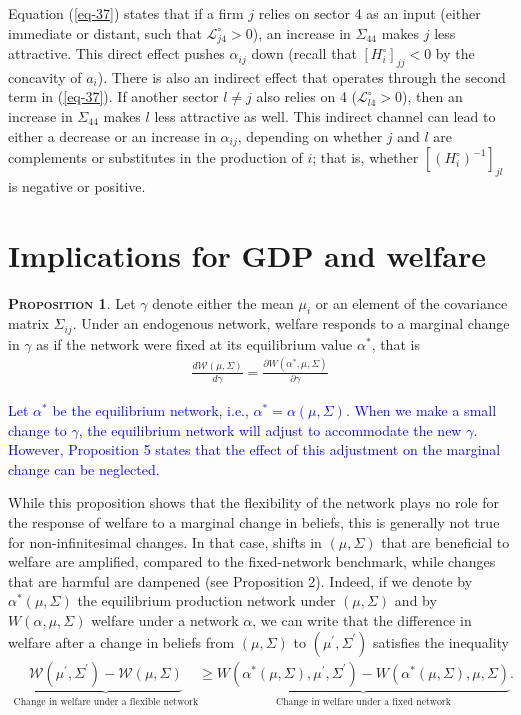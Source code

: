 \documentclass[11pt]{article}
\theoremstyle{definition}
\newtheorem{prop}{\noindent \textbf{\textsc{Proposition}}}
\begin{document}
	Equation (\ref{eq-37}) states that if a firm $j$ relies on sector 4 as an input (either immediate or distant, such that $\mathcal{L}_{j4}^{\circ} > 0$), an increase in $\Sigma_{44}$ makes $j$ less attractive. This direct effect pushes $\alpha_{ij}$ down (recall
	that $[H_i^{\circ}]_{jj} < 0$ by the concavity of $a_i$). There is also an indirect effect that operates through the second term in (\ref{eq-37}). If another sector $l\neq j$ also relies on 4 ($\mathcal{L}_{l4}^{\circ} > 0$), then an increase in $\Sigma_{44}$
	makes $l$ less attractive as well. This indirect channel can lead to either a decrease or an increase in $\alpha_{ij}$, depending on whether $j$ and $l$ are complements or substitutes in the production of $i$; that is, whether $[(H_i^{\circ})^{-1}]_{jl}$ is negative or positive.
	
	\section{Implications for GDP and welfare}
	\begin{prop}
		Let $\gamma$ denote either the mean $\mu_i$ or an element of the covariance matrix $\Sigma_{ij}$. Under an endogenous network, welfare responds to a marginal change in $\gamma$ as if the network were fixed at its equilibrium value $\alpha^*$, that is
		\begin{align*}
			\frac{d\mathcal{W}(\mu,\Sigma)}{d\gamma} = \frac{\partial W(\alpha^*,\mu,\Sigma)}{\partial\gamma}
		\end{align*}
	\end{prop}
	
	\textcolor{blue}{Let \(\alpha^*\) be the equilibrium network, i.e., \(\alpha^* = \alpha(\mu, \Sigma)\). When we make a small change to \(\gamma\), the equilibrium network will adjust to accommodate the new \(\gamma\). However, Proposition 5 states that the effect of this adjustment on the marginal change can be neglected.}

	While this proposition shows that the flexibility of the network plays no role for the response of welfare to a marginal change in beliefs, this is generally not true for non-infinitesimal changes. In that case, shifts in $(\mu, \Sigma)$ that are beneficial to welfare are amplified, compared to the fixed-network benchmark, while changes that are harmful are dampened (see Proposition 2). Indeed, if we denote by $\alpha^*(\mu,\Sigma)$ the equilibrium production network under $(\mu, \Sigma)$ and by $W(\alpha,\mu,\Sigma)$ welfare under a network $\alpha$, we can write that the difference in welfare after a change in beliefs from $(\mu,\Sigma)$ to $(\mu^{\prime},\Sigma^{\prime})$ satisfies the inequality
	\begin{align}
		\underbrace{\mathcal{W}(\mu^{\prime},\Sigma^{\prime}) - \mathcal{W}(\mu,\Sigma)}\limits_{\text{Change in welfare under a flexible network}} \geqslant \underbrace{W(\alpha^*(\mu,\Sigma),\mu^{\prime},\Sigma^{\prime}) - W(\alpha^*(\mu,\Sigma),\mu,\Sigma)}\limits_{\text{Change in welfare under a fixed network}}. \label{eq-38}
	\end{align}
	
\end{document}
